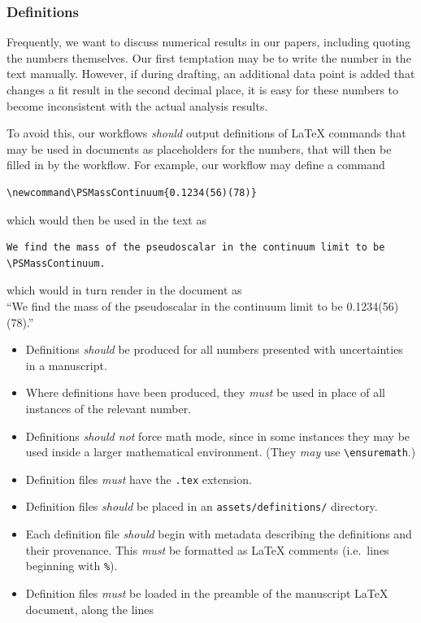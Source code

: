 \documentclass{article}
\newcommand\rfcword[1]{\emph{#1}\xspace}
\newcommand\must{\rfcword{must}}
\newcommand\should{\rfcword{should}}
\newcommand\shouldnot{\rfcword{should not}}
\newcommand\may{\rfcword{may}}
\newcommand\filename[1]{\texttt{#1}\xspace}
\begin{document}
\subsubsection{Definitions}

Frequently,
we want to discuss numerical results in our papers,
including quoting the numbers themselves.
Our first temptation may be to write the number in the text manually.
However,
if during drafting,
an additional data point is added that changes a fit result in the second decimal place,
it is easy for these numbers to become inconsistent with the actual analysis results.

To avoid this,
our workflows \should output definitions of LaTeX commands
that may be used in documents as placeholders for the numbers,
that will then be filled in by the workflow.
For example,
our workflow may define a command
\begin{verbatim}
\newcommand\PSMassContinuum{0.1234(56)(78)}
\end{verbatim}
which would then be used in the text as
\begin{verbatim}
We find the mass of the pseudoscalar in the continuum limit to be \PSMassContinuum.
\end{verbatim}
which would in turn render in the document as\\
``We find the mass of the pseudoscalar in the continuum limit to be 0.1234(56)(78).''

\begin{itemize}
  \item
        Definitions \should be produced for all numbers presented with uncertainties in a manuscript.
  \item
        Where definitions have been produced,
        they \must be used in place of all instances of the relevant number.
  \item
        Definitions \shouldnot force math mode,
        since in some instances they may be used inside a larger mathematical environment.
        (They \may use \verb|\ensuremath|.)
  \item
        Definition files \must have the \filename{.tex} extension.
  \item
        Definition files \should be placed in an \filename{assets/definitions/} directory.
  \item
        Each definition file \should begin with metadata describing the definitions and their provenance.
        This \must be formatted as LaTeX comments
        (i.e.\ lines beginning with \verb|%|).
  \item
        Definition files \must be loaded in the preamble of the manuscript LaTeX document,
        along the lines
\begin{verbatim}

\end{verbatim}
\end{itemize}
\end{document}
